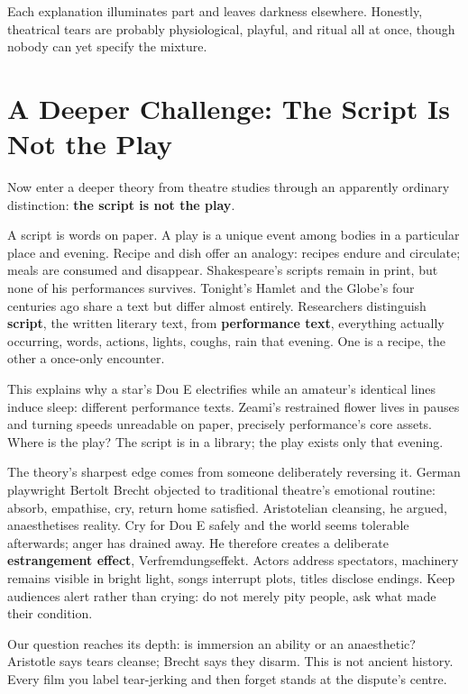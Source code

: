Each explanation illuminates part and leaves darkness elsewhere. Honestly, theatrical tears are probably physiological, playful, and ritual all at once, though nobody can yet specify the mixture.

\section[Further Challenge: Script and Play]{A Deeper Challenge: The Script Is Not the Play}
Now enter a deeper theory from theatre studies through an apparently ordinary distinction: \textbf{the script is not the play}.

A script is words on paper. A play is a unique event among bodies in a particular place and evening. Recipe and dish offer an analogy: recipes endure and circulate; meals are consumed and disappear. Shakespeare's scripts remain in print, but none of his performances survives. Tonight's Hamlet and the Globe's four centuries ago share a text but differ almost entirely. Researchers distinguish \textbf{script}, the written literary text, from \textbf{performance text}, everything actually occurring, words, actions, lights, coughs, rain that evening. One is a recipe, the other a once-only encounter.

This explains why a star's Dou E electrifies while an amateur's identical lines induce sleep: different performance texts. Zeami's restrained flower lives in pauses and turning speeds unreadable on paper, precisely performance's core assets. Where is the play? The script is in a library; the play exists only that evening.

The theory's sharpest edge comes from someone deliberately reversing it. German playwright Bertolt Brecht objected to traditional theatre's emotional routine: absorb, empathise, cry, return home satisfied. Aristotelian cleansing, he argued, anaesthetises reality. Cry for Dou E safely and the world seems tolerable afterwards; anger has drained away. He therefore creates a deliberate \textbf{estrangement effect}, Verfremdungseffekt. Actors address spectators, machinery remains visible in bright light, songs interrupt plots, titles disclose endings. Keep audiences alert rather than crying: do not merely pity people, ask what made their condition.

Our question reaches its depth: is immersion an ability or an anaesthetic? Aristotle says tears cleanse; Brecht says they disarm. This is not ancient history. Every film you label tear-jerking and then forget stands at the dispute's centre.

